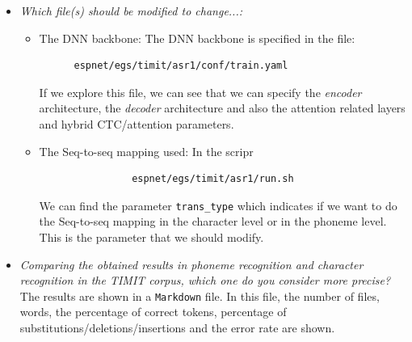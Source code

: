 \documentclass[a4paper]{article}
\def\inline{\lstinline[basicstyle=\ttfamily,keywordstyle={}]}
\begin{document}
\begin{itemize}
  \item \emph{Which file(s) should be modified to change...:}\\
        \begin{itemize}
          \item The DNN backbone: The DNN backbone is specified in the file:
                \begin{verbatim}
      espnet/egs/timit/asr1/conf/train.yaml
    \end{verbatim}
                If we explore this file, we can see that we can specify the \emph{encoder} architecture, the \emph{decoder} architecture and also the attention related layers and hybrid CTC/attention parameters.
          \item The Seq-to-seq mapping used: In the scripr
                \begin{verbatim}
                espnet/egs/timit/asr1/run.sh
\end{verbatim}
                We can find the parameter \inline{trans_type} which indicates if we want to do the Seq-to-seq mapping in the character level or in the phoneme level. This is the parameter that we should modify.
        \end{itemize}

  \item \emph{Comparing the obtained results in phoneme recognition and character recognition in the TIMIT corpus, which one do you consider more precise?}\\

        The results are shown in a \inline{Markdown} file. In this file, the number of files, words, the percentage of correct tokens, percentage of substitutions/deletions/insertions and the error rate are shown.


\end{itemize}
\end{document}
